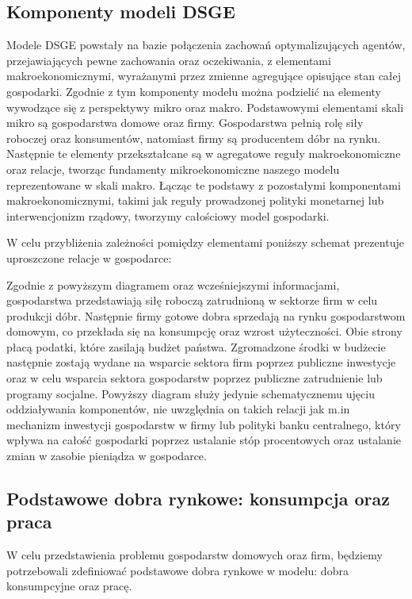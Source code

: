 \subsection{Komponenty modeli DSGE}

Modele DSGE powstały na bazie połączenia zachowań optymalizujących agentów, przejawiających pewne zachowania oraz oczekiwania, z elementami makroekonomicznymi, wyrażanymi przez zmienne agregujące opisujące stan całej gospodarki. Zgodnie z tym komponenty modelu można podzielić na elementy wywodzące się z perspektywy mikro oraz makro. Podstawowymi elementami skali mikro są gospodarstwa domowe oraz firmy. Gospodarstwa pełnią rolę siły roboczej oraz konsumentów, natomiast firmy są producentem dóbr na rynku. Następnie te elementy przekształcane są w agregatowe reguły makroekonomiczne oraz relacje, tworząc fundamenty mikroekonomiczne naszego modelu reprezentowane w skali makro. Łącząc te podstawy z pozostałymi komponentami makroekonomicznymi, takimi jak reguły prowadzonej polityki monetarnej lub interwencjonizm rządowy, tworzymy całościowy model gospodarki.

W celu przybliżenia zależności pomiędzy elementami poniższy schemat prezentuje uproszczone relacje w gospodarce:
\begin{center}
    
\end{center}
Zgodnie z powyższym diagramem oraz wcześniejszymi informacjami, gospodarstwa przedstawiają siłę roboczą zatrudnioną w sektorze firm w celu produkcji dóbr. Następnie firmy gotowe dobra sprzedają na rynku gospodarstwom domowym, co przekłada się na konsumpcję oraz wzrost użyteczności. Obie strony płacą podatki, które zasilają budżet państwa. Zgromadzone środki w budżecie następnie zostają wydane na wsparcie sektora firm poprzez publiczne inwestycje oraz w celu wsparcia sektora gospodarstw poprzez publiczne zatrudnienie lub programy socjalne. Powyższy diagram służy jedynie schematycznemu ujęciu oddziaływania komponentów, nie uwzględnia on takich relacji jak m.in mechanizm inwestycji gospodarstw w firmy lub polityki banku centralnego, który wpływa na całość gospodarki poprzez ustalanie stóp procentowych oraz ustalanie zmian w zasobie pieniądza w gospodarce.

\subsection{Podstawowe dobra rynkowe: konsumpcja oraz praca}

W celu przedstawienia problemu gospodarstw domowych oraz firm, będziemy potrzebowali zdefiniować podstawowe dobra rynkowe w modelu: dobra konsumpcyjne oraz pracę.

